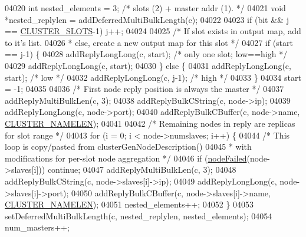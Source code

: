 \begin{DoxyCode}
{{{{{{{{{{{{{{{{{{{{{{{{{{{{{{{{{{{{{{{{{{{{{{{{{{{{{{{{{{{{{{{{{{{{{{{04020                 \textcolor{keywordtype}{int} nested\_elements = 3; \textcolor{comment}{/* slots (2) + master addr (1). */}
04021                 \textcolor{keywordtype}{void} *nested\_replylen = addDeferredMultiBulkLength(c);
04022 
04023                 \textcolor{keywordflow}{if} (bit && j == \hyperlink{cluster_8h_aa3e2cb951eebb16725ecc3f5beefd9fd}{CLUSTER\_SLOTS}-1) j++;
04024 
04025                 \textcolor{comment}{/* If slot exists in output map, add to it's list.}
04026 \textcolor{comment}{                 * else, create a new output map for this slot */}
04027                 \textcolor{keywordflow}{if} (start == j-1) \{
04028                     addReplyLongLong(c, start); \textcolor{comment}{/* only one slot; low==high */}
04029                     addReplyLongLong(c, start);
04030                 \} \textcolor{keywordflow}{else} \{
04031                     addReplyLongLong(c, start); \textcolor{comment}{/* low */}
04032                     addReplyLongLong(c, j-1);   \textcolor{comment}{/* high */}
04033                 \}
04034                 start = -1;
04035 
04036                 \textcolor{comment}{/* First node reply position is always the master */}
04037                 addReplyMultiBulkLen(c, 3);
04038                 addReplyBulkCString(c, node->ip);
04039                 addReplyLongLong(c, node->port);
04040                 addReplyBulkCBuffer(c, node->name, \hyperlink{cluster_8h_ace7a882972eff7149675252938643b6e}{CLUSTER\_NAMELEN});
04041 
04042                 \textcolor{comment}{/* Remaining nodes in reply are replicas for slot range */}
04043                 \textcolor{keywordflow}{for} (i = 0; i < node->numslaves; i++) \{
04044                     \textcolor{comment}{/* This loop is copy/pasted from clusterGenNodeDescription()}
04045 \textcolor{comment}{                     * with modifications for per-slot node aggregation */}
04046                     \textcolor{keywordflow}{if} (\hyperlink{cluster_8h_a6a31c614ff4f5ac8ebaa630b0a921c3d}{nodeFailed}(node->slaves[i])) \textcolor{keywordflow}{continue};
04047                     addReplyMultiBulkLen(c, 3);
04048                     addReplyBulkCString(c, node->slaves[i]->ip);
04049                     addReplyLongLong(c, node->slaves[i]->port);
04050                     addReplyBulkCBuffer(c, node->slaves[i]->name, 
      \hyperlink{cluster_8h_ace7a882972eff7149675252938643b6e}{CLUSTER\_NAMELEN});
04051                     nested\_elements++;
04052                 \}
04053                 setDeferredMultiBulkLength(c, nested\_replylen, nested\_elements);
04054                 num\_masters++;
}}}}}}}}}}}}}}}}}}}}}}}}}}}}}}}}}}}}}}}}}}}}}}}}}}}}}}}}}}}}}}}}}}}}}}}
\end{DoxyCode}
